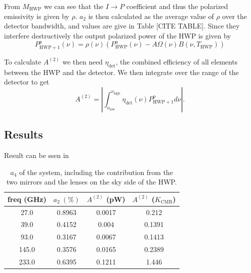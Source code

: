 \documentclass{article}
\theoremstyle{remark}
\newcommand{\tab}{\hspace*{2em}}
\renewcommand{\t}[1]{\text{#1}}
\newcommand{\A}[1]{A^{(#1)}}
\newcommand{\ip}{$I\rightarrow P$ }
\newcommand{\abs}[1]{\left|#1\right|}%
\begin{document}
\tab From $M_\t{HWP}$ we can see that the \ip coefficient and thus the polarized emissivity is given by $\rho$. 
$a_2$ is then calculated as the average value of $\rho$ over the detector bandwidth, and values are give in Table [CITE TABLE].
Since they interfere destructively the output polarized power of the HWP is given by
\[
P^p_{\t{HWP} + 1}(\nu)= \rho(\nu) \left(P^u_\t{HWP}(\nu) - A \Omega(\nu) B(\nu, T_\t{HWP}) \right) 	
\]

\tab To calculate $\A2$ we then need $\eta_\t{det}$, the combined efficiency of all elements between the HWP and the detector.
We then integrate over the range of the detector to get
\[
\A2 = \abs{ \int_{\nu_\t{low}}^{\nu_\t{high}} \eta_\t{det}(\nu) P^p_{\t{HWP} + 1} d\nu }.
\]




\subsection*{Results}

Result can be ssen in 




\begin{table}
\centering
\begin{tabular}{ |c|c|c|c|} 
	\hline
	freq (GHz) &  $a_2\; (\%)$ & $\A2$ (pW)  & $\A2$ ($K_\t{CMB}$) \\ \hline
	27.0  & 0.8963 & 0.0017 & 0.212 \\ 
	39.0  & 0.4152 & 0.004  & 0.1391\\ 
	93.0  & 0.3167 & 0.0067 & 0.1413\\ 
	145.0 & 0.3576 & 0.0165 & 0.2389\\ 
	233.0 & 0.6395 & 0.1211 & 1.446 \\ 
	\hline	
\end{tabular}



\caption{ $a_4$ of the system, including the contribution from the two mirrors and the lenses on the sky side of the HWP.
}
\label{table:SO_a4}
\end{table}
 
\printbibliography
\end{document}
